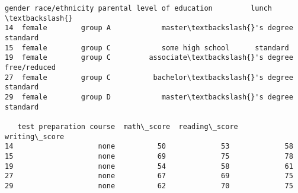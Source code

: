             \begin{tcolorbox}[breakable, size=fbox, boxrule=.5pt, pad at break*=1mm, opacityfill=0]
\begin{Verbatim}[commandchars=\\\{\}]
    gender race/ethnicity parental level of education         lunch  \textbackslash{}
14  female        group A            master\textbackslash{}'s degree      standard
15  female        group C            some high school      standard
19  female        group C         associate\textbackslash{}'s degree  free/reduced
27  female        group C          bachelor\textbackslash{}'s degree      standard
29  female        group D            master\textbackslash{}'s degree      standard

   test preparation course  math\_score  reading\_score  writing\_score
14                    none          50             53             58
15                    none          69             75             78
19                    none          54             58             61
27                    none          67             69             75
29                    none          62             70             75
\end{Verbatim}
\end{tcolorbox}

